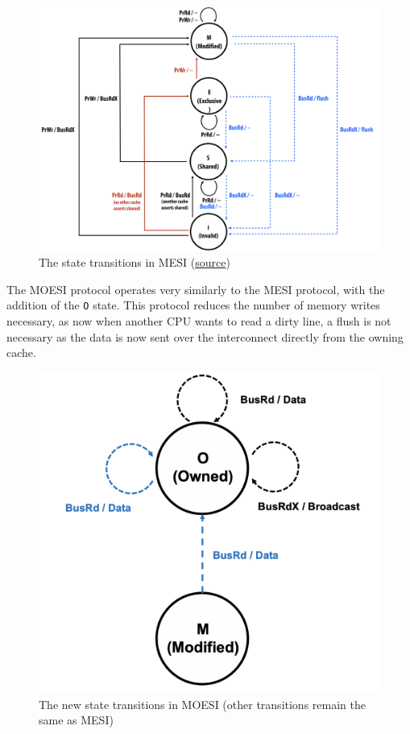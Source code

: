 \documentclass{article}
\def\inline{\lstinline[language=C++, basicstyle=\ttfamily]}
\begin{document}
\begin{figure}[H]
\centering
\includegraphics[width=.8\textwidth]{figures/mesi.png}
\caption{The state transitions in MESI (\href{http://www.cs.cmu.edu/afs/cs/academic/class/15418-f20/public/lectures/10\_cachecoherence1.pdf}{source})}
\end{figure}

The MOESI protocol operates very similarly to the MESI protocol, with the addition of the \inline{O} state.  This protocol reduces the number of memory writes necessary, as now when another CPU wants to read a dirty line, a flush is not necessary as the data is now sent over the interconnect directly from the owning cache.

\begin{figure}[H]
\centering
\includegraphics[width=.3\textwidth]{figures/moesi.png}
    \caption{The new state transitions in MOESI (other transitions remain the same as MESI)}
\end{figure}
\end{document}
